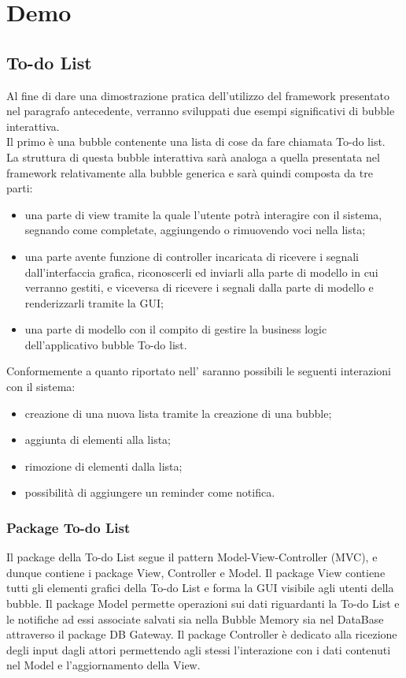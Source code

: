 \section{Demo}

\subsection{To-do List}
Al fine di dare una dimostrazione pratica dell'utilizzo del framework presentato nel paragrafo antecedente, verranno sviluppati due esempi significativi di bubble interattiva.\\
Il primo è una bubble contenente una lista di cose da fare chiamata To-do list.\\
La struttura di questa bubble interattiva sarà analoga a quella presentata nel framework relativamente alla bubble generica e sarà quindi composta da tre parti:
\begin{itemize}
	\item una parte di view tramite la quale l'utente potrà interagire con il sistema, segnando come completate, aggiungendo o rimuovendo voci nella lista;
	\item una parte avente funzione di controller incaricata di ricevere i segnali dall'interfaccia grafica, riconoscerli ed inviarli alla parte di modello in cui verranno gestiti, e viceversa di ricevere i segnali dalla parte di modello e renderizzarli tramite la GUI;
	\item una parte di modello con il compito di gestire la business logic dell'applicativo bubble To-do list.
\end{itemize}
Conformemente a quanto riportato nell'\AnalisiDeiRequisiti{} saranno possibili le seguenti interazioni con il sistema:
\begin{itemize}
	\item creazione di una nuova lista tramite la creazione di una bubble;
	\item aggiunta di elementi alla lista;
	\item rimozione di elementi dalla lista;
	\item possibilità di aggiungere un reminder come notifica.
\end{itemize}

\subsubsection{Package To-do List}

Il package della To-do List segue il pattern Model-View-Controller (MVC), e dunque contiene i package View, Controller e Model. Il package View contiene tutti gli elementi grafici della To-do List e forma la GUI visibile agli utenti della bubble. Il package Model permette operazioni sui dati riguardanti la To-do List e le notifiche ad essi associate salvati sia nella Bubble Memory sia nel DataBase attraverso il package DB Gateway. Il package Controller è dedicato alla ricezione degli input dagli attori permettendo agli stessi l’interazione con i dati contenuti nel Model e l’aggiornamento della View.

